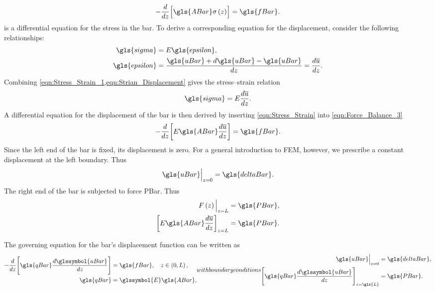 \begin{equation}	\label{eqn:Force_Balance_3}
		-\frac{ d }{ dz } \Bigl[ \gls{ABar} \sigma \left( z \right) \Bigr] = \gls{fBar}.
\end{equation}
 is a differential equation for the stress in the bar. To derive a corresponding equation for the
displacement, consider the following relationships:
\begin{subequations}
	\begin{align}
		\gls{sigma} &= E \gls{epsilon}	\label{eqn:Stress_Strain_1},	\\
		\gls{epsilon} &= \frac{ \gls{uBar} + d \gls{uBar} - \gls{uBar} }{dz} = \frac{ d \overline{u} }{ dz }.
		\label{eqn:Strian_Displacement}
	\end{align}
\end{subequations}
Combining \cref{eqn:Stress_Strain_1,eqn:Strian_Displacement} gives the stress--strain relation
\begin{equation}	\label{eqn:Stress_Strain}
		\gls{sigma} = E \frac{ d \overline{u} }{ dz }.
\end{equation}
A differential equation for the displacement of the bar is then derived by inserting \cref{eqn:Stress_Strain} into
\cref{eqn:Force_Balance_3}
\begin{equation}	\label{eqn:Force_Balance}
		-\frac{ d }{ dz } \biggl[ E \gls{ABar} \frac{ d \overline{u} }{ dz } \biggr] = \gls{fBar}.
\end{equation}
Since the left end of the bar is fixed, its displacement is zero. For a general introduction to FEM, however, we prescribe a
constant displacement at the left boundary. Thus
\begin{equation}
	\gls{uBar} \Big \vert_{z = 0} = \gls{deltaBar}.
\end{equation}
The right end of the bar is subjected to force \gls{PBar}. Thus
\begin{align}
		F \left( z \right) \Big \vert_{z = L} &= \gls{PBar},	\\
		\biggl[ E \gls{ABar} \frac{ d \overline{u} }{ dz } \biggr]_{z = L} &= \gls{PBar}.
\end{align}
\begin{problem} \label{prb:Non_Normalized_Problem}
	The governing equation for the \gls{bar}'s displacement function can be written as
	\begin{subequations} \label{eqn:Non_Normalized_Problem}
		\begin{align}
			-\frac{d}{dz} \Biggl[ \gls{qBar} \frac{d \glssymbol{uBar}}{dz} \Biggr] &= \gls{fBar},
			\quad z \in \left( 0, L \right), \label{eqn:Non_Normalized_Diff_Eq}	\\
			\gls{qBar} &= \glssymbol{E} \gls{ABar},	\label{eqn:Non_Normalized_Rigidity}
		\end{align}
		with boundary conditions
		\begin{align}
			\gls{uBar}\Big\vert_{z=0} &= \gls{deltaBar}, \label{eqn:Non_Normalized_Dirichlet_Cond} \\
			\Biggl[ \gls{qBar} \frac{d \glssymbol{uBar}}{dz} \Biggr]_{z = \gls{L}} &= \gls{PBar}.
				\label{eqn:Non_Normalized_Normal_Cond}
		\end{align}
	\end{subequations}
\end{problem}
